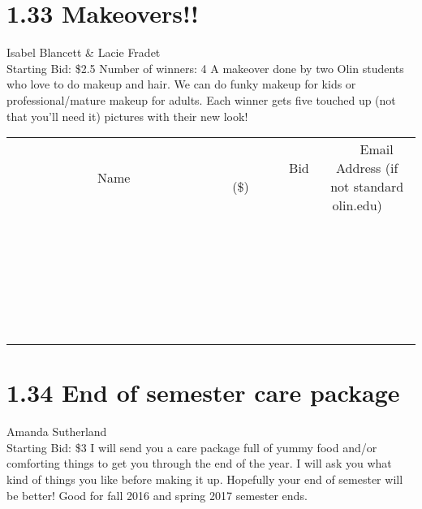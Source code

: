 \documentclass[11pt]{article}
\begin{document}
\section*{1.33 Makeovers!!}
Isabel Blancett \& Lacie Fradet
\\
Starting Bid: \$2.5
\newline
Number of winners: 4
\newline
A makeover done by two Olin students who love to do makeup and hair.  We can do funky makeup for kids or professional/mature makeup for adults.  Each winner gets five touched up (not that you'll need it) pictures with their new look!
\\[6ex]
\begin{tabular}{c c c}
~~~~~~~~~~~~~Name~~~~~~~~~~~~~ & ~~~~~~~~~Bid (\$)~~~~~~~~~  & ~~~Email Address (if not standard olin.edu)~~~\\
 & & \\
\hline
 & & \\
\hline
 & & \\
\hline
 & & \\
\hline
 & & \\
\hline
 & & \\
\hline
 & & \\
\hline
 & & \\
\hline
 & & \\
\hline
 & & \\
\hline
 & & \\
\hline
 & & \\
\hline
 & & \\
\hline
 & & \\
\hline
 & & \\
\hline
 & & \\
\hline
 & & \\
\hline
 & & \\
\hline
 & & \\
\hline
 & & \\
\hline
 & & \\
\hline
 & & \\
\hline
 & & \\
\hline
 & & \\
\hline
 & & \\
\hline
 & & \\
\hline
\end{tabular}
\newpage
\section*{1.34 End of semester care package}
Amanda Sutherland
\\
Starting Bid: \$3
\newline
I will send you a care package full of yummy food and/or comforting things to get you through the end of the year. I will ask you what kind of things you like before making it up. Hopefully your end of semester will be better! Good for fall 2016 and spring 2017 semester ends. 
\end{document}
